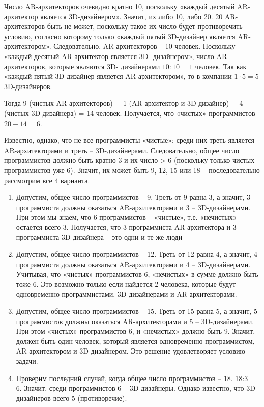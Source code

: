 \solutionSection

Число AR-архитекторов очевидно кратно 10, поскольку «каждый десятый 
AR-архитектор является 3D-дизайнером». Значит, их либо 10, либо 20. 
20 AR-архитекторов быть не может, поскольку такое их число будет противоречить 
условию, согласно которому только «каждый пятый 3D-дизайнер является 
AR-архитектором». Следовательно, AR-архитекторов – 10 человек.
Поскольку «каждый десятый AR-архитектор является 3D- дизайнером», 
число AR-архитекторов, которые являются 3D- дизайнерами $10:10 = 1$ человек. 
Так как «каждый пятый 3D-дизайнер является AR-архитектором», то в компании 
$1 \cdot 5 = 5$ 3D-дизайнеров.


Тогда 9 (чистых AR-архитекторов) + 1 (AR-архитектор и 3D-дизайнер) + 4 (чистых 3D-дизайнера) = 14 человек. 
Получается, что «чистых» программистов $20-14 = 6$.

Известно, однако, что не все программисты «чистые»: среди них треть является AR-архитекторами и треть – 3D-дизайнерами. Следовательно, общее число программистов должно быть кратно 3 и их число > 6 (поскольку только чистых программистов уже 6). Значит, их может быть 9, 12, 15 или 18 – последовательно рассмотрим все 4 варианта.

\begin{enumerate}
    \item Допустим, общее число программистов – 9. Треть от 9 равна 3, а значит, 3 программиста должны оказаться AR-архитекторами и 3 – 3D-дизайнерами. При этом мы знаем, что 6 программистов – «чистые», т.е. «нечистых» остается всего 3. Получается, что 3 программиста-AR-архитектора и 3 программиста-3D-дизайнера – это одни и те же люди
    \item Допустим, общее число программистов – 12. Треть от 12 равна 4, а значит, 4 программиста должны оказаться AR-архитекторами и 4 – 3D-дизайнерами. Учитывая, что «чистых» программистов 6, «нечистых» в сумме должно быть тоже 6. Это возможно только если найдется 2 человека, которые будут одновременно программистами, 3D-дизайнерами и AR-архитекторами.
    \item Допустим, общее число программистов – 15. Треть от 15 равна 5, а значит, 5 программистов должны оказаться AR-архитекторами и 5 – 3D-дизайнерами. При этом «чистых» программистов 6, и «нечистых» должно быть 9. Значит, должен быть один человек, который является одновременно программистом, AR-архитектором и 3D-дизайнером.
    Это решение удовлетворяет условию задачи.
    \item Проверим последний случай, когда общее число программистов – 18. 18:3 = 6. Значит, среди программистов 6 – 3D-дизайнеры. Однако известно, что 3D-дизайнеров всего 5 (противоречие).
\end{enumerate}


